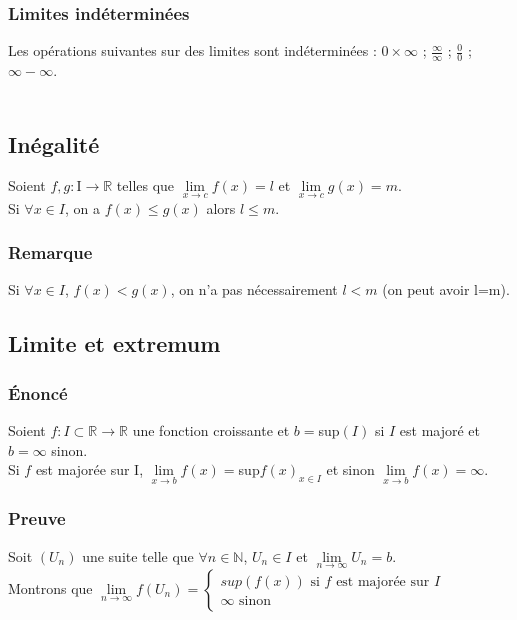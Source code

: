 \documentclass[a4paper,10pt]{book} %
\newcommand{\R}{\mathbb{R}}
\newcommand{\N}{\mathbb{N}}
\begin{document}
\subsubsection{Limites indéterminées}
Les opérations suivantes sur des limites sont indéterminées : $0\times\infty$ ; $\frac{\infty}{\infty}$ ; $\frac{0}{0}$ ; $\infty-\infty$.\\\\

\subsection{Inégalité}
Soient $f,g : $I$ \rightarrow \R$ telles que $\lim\limits_{x\rightarrow c}f(x)=l$ et $\lim\limits_{x\rightarrow c} g(x)=m$.\\
Si $\forall x\in I$, on a $f(x)\leq g(x)$ alors $l\leq m$.

\subsubsection{Remarque}
Si $\forall x\in I$, $f(x)< g(x)$, on n'a pas nécessairement $l<m$ (on peut avoir l=m).

\newpage

\subsection{Limite et extremum}
\subsubsection{Énoncé}
Soient $f : I\subset \R\rightarrow \R$ une fonction croissante et $b=$sup$(I)$ si $I$ est majoré et $b=\infty$ sinon.\\
Si $f$ est majorée sur I, $\lim\limits_{x\rightarrow b} f(x)=$sup$ f(x)_{x\in I}$ et sinon $\lim\limits_{x\rightarrow b} f(x)=\infty$.

\subsubsection{Preuve}
Soit $(U_{n})$ une suite telle que $\forall n\in \N$, $U_{n}\in I$ et $\lim\limits_{n\rightarrow \infty} U_{n}=b$.\\

Montrons que $\lim\limits_{n\rightarrow \infty} f(U_{n})=\left\{\begin{array}{lcl}
sup(f(x))\text{ si $f$ est majorée sur $I$ }&&\\
\infty\text{ sinon }&&\end{array}\right.$
\end{document}
